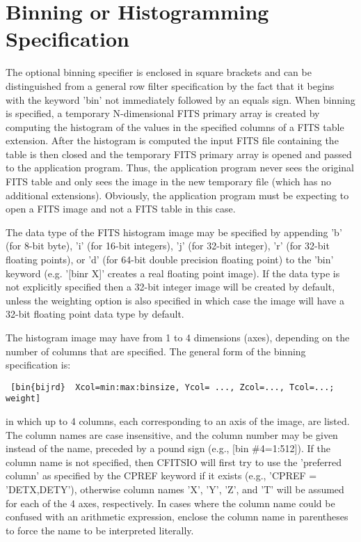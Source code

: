 \documentclass[11pt]{book}
\begin{document}
\section{ Binning or Histogramming Specification}

The optional binning specifier is enclosed in square brackets and can
be distinguished from a general row filter specification by the fact
that it begins with the keyword 'bin'  not immediately followed by an
equals sign.  When binning is specified, a temporary N-dimensional FITS
primary array is created by computing the histogram of the values in
the specified columns of a FITS table extension.  After the histogram
is computed the input FITS file containing the table is then closed and
the temporary FITS primary array is opened and passed to the
application program.  Thus, the application program never sees the
original FITS table and only sees the image in the new temporary file
(which has no additional extensions).  Obviously, the application
program must be expecting to open a FITS image and not a FITS table in
this case.

The data type of the FITS histogram image may be specified by appending
'b' (for 8-bit byte), 'i' (for 16-bit integers), 'j' (for 32-bit
integer), 'r' (for 32-bit floating points), or 'd' (for 64-bit double
precision floating point)  to the 'bin' keyword (e.g. '[binr X]'
creates a real floating point image).  If the data type is not
explicitly specified then a 32-bit integer image will be created by
default, unless the weighting option is also specified in which case
the image will have a 32-bit floating point data type by default.

The histogram image may have from 1 to 4 dimensions (axes), depending
on the number of columns that are specified.  The general form of the
binning specification is:

\begin{verbatim}
 [bin{bijrd}  Xcol=min:max:binsize, Ycol= ..., Zcol=..., Tcol=...; weight]
\end{verbatim}
in which up to 4 columns, each corresponding to an axis of the image,
are listed. The column names are case insensitive, and the column
number may be given instead of the name, preceded by a pound sign
(e.g., [bin \#4=1:512]).  If the column name is not specified, then
CFITSIO will first try to use the 'preferred column' as specified by
the CPREF keyword if it exists (e.g., 'CPREF = 'DETX,DETY'), otherwise
column names 'X', 'Y', 'Z', and 'T' will be assumed for each of the 4
axes, respectively.  In cases where the column name could be confused
with an arithmetic expression, enclose the column name in parentheses to
force the name to be interpreted literally.
\end{document}
